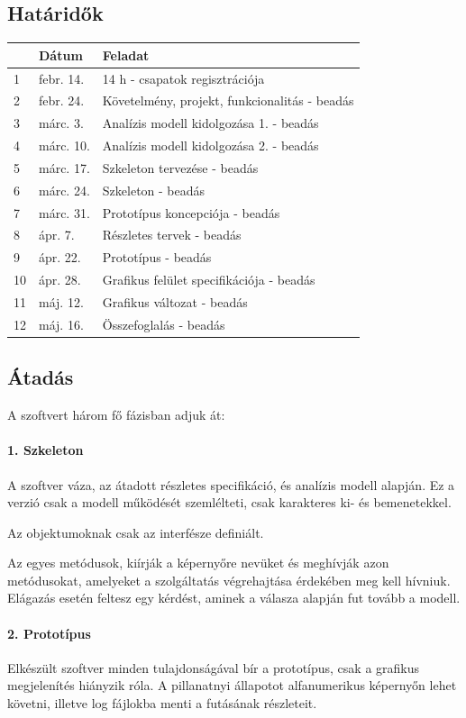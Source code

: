 \subsection{Határidők}
\begin{longtable}{| l | l | l |}
\hline
\textbf{} & \textbf{Dátum} & \textbf{Feladat}
\tabularnewline
\hline


1 & febr. 14. & 14 h - csapatok regisztrációja \tabularnewline \hline
2 & febr. 24. & Követelmény, projekt, funkcionalitás - beadás \tabularnewline \hline
3 & márc. 3. & Analízis modell kidolgozása 1. - beadás \tabularnewline \hline
4 & márc. 10. & Analízis modell kidolgozása 2. - beadás \tabularnewline \hline
5 & márc. 17. & Szkeleton tervezése - beadás \tabularnewline \hline
6 & márc. 24. & Szkeleton - beadás \tabularnewline \hline
7 & márc. 31. & Prototípus koncepciója - beadás \tabularnewline \hline
8 & ápr. 7. & Részletes tervek - beadás \tabularnewline \hline
9 & ápr. 22. & Prototípus - beadás \tabularnewline \hline
10 & ápr. 28. & Grafikus felület specifikációja - beadás \tabularnewline \hline
11 & máj. 12. & Grafikus változat - beadás \tabularnewline \hline
12 & máj. 16. & Összefoglalás - beadás \tabularnewline \hline


\end{longtable}
\subsection{Átadás}

A szoftvert három fő fázisban adjuk át:
\paragraph{1.	Szkeleton}
A szoftver váza, az átadott részletes specifikáció, és analízis modell alapján. Ez a verzió csak a modell működését szemlélteti, csak karakteres ki- és bemenetekkel.

Az objektumoknak csak az interfésze definiált.

Az egyes metódusok, kiírják a képernyőre nevüket és meghívják azon metódusokat, amelyeket a szolgáltatás végrehajtása érdekében meg kell hívniuk. Elágazás esetén feltesz egy kérdést, aminek a válasza alapján fut tovább a modell.
\paragraph{2.	Prototípus}
Elkészült szoftver minden tulajdonságával bír a prototípus, csak a grafikus megjelenítés hiányzik róla. A pillanatnyi állapotot alfanumerikus képernyőn lehet követni, illetve log fájlokba menti a futásának részleteit.
